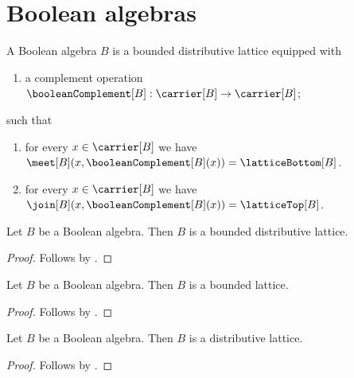 \section{Boolean algebras}



\begin{struct}\label{boolean_algebra}
    A Boolean algebra $B$ is a bounded distributive lattice equipped with
    \begin{enumerate}
        \item\label{boolean_complement_graph}
            a complement operation
            $\booleanComplement[B]:\carrier[B]\to\carrier[B]$;
    \end{enumerate}
    such that
    \begin{enumerate}
        \item\label{boolean_meet_complement_law}
            for every $x\in\carrier[B]$ we have
                $\meet[B](x,\booleanComplement[B](x))
                    =\latticeBottom[B]$.
        \item\label{boolean_join_complement_law}
            for every $x\in\carrier[B]$ we have
                $\join[B](x,\booleanComplement[B](x))
                    =\latticeTop[B]$.
    \end{enumerate}
\end{struct}

\begin{proposition}\label{boolean_algebra_is_bounded_distributive_lattice}
    Let $B$ be a Boolean algebra.
    Then $B$ is a bounded distributive lattice.
\end{proposition}
\begin{proof}
    Follows by .
\end{proof}

\begin{proposition}\label{boolean_algebra_is_bounded_lattice}
    Let $B$ be a Boolean algebra.
    Then $B$ is a bounded lattice.
\end{proposition}
\begin{proof}
    Follows by
        .
\end{proof}

\begin{proposition}\label{boolean_algebra_is_distributive_lattice}
    Let $B$ be a Boolean algebra.
    Then $B$ is a distributive lattice.
\end{proposition}
\begin{proof}
    Follows by
        .
\end{proof}

